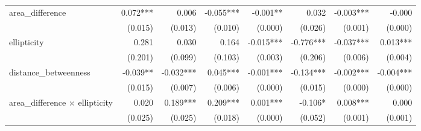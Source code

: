 \begin{tabular}{lrrrrrrr}
area\_difference                           &                     0.072*** &                      0.006 &                    -0.055*** &                         -0.001** &                          0.032 &                                                         -0.003*** &                                              -0.000 \\ 
                                           &                      (0.015) &                    (0.013) &                      (0.010) &                          (0.000) &                        (0.026) &                                                           (0.001) &                                             (0.000) \\ 
ellipticity                                &                        0.281 &                      0.030 &                        0.164 &                        -0.015*** &                      -0.776*** &                                                         -0.037*** &                                            0.013*** \\ 
                                           &                      (0.201) &                    (0.099) &                      (0.103) &                          (0.003) &                        (0.206) &                                                           (0.006) &                                             (0.004) \\ 
distance\_betweenness                      &                     -0.039** &                  -0.032*** &                     0.045*** &                        -0.001*** &                      -0.134*** &                                                         -0.002*** &                                           -0.004*** \\ 
                                           &                      (0.015) &                    (0.007) &                      (0.006) &                          (0.000) &                        (0.015) &                                                           (0.000) &                                             (0.000) \\ 
area\_difference $\times$ ellipticity      &                        0.020 &                   0.189*** &                     0.209*** &                         0.001*** &                        -0.106* &                                                          0.008*** &                                               0.000 \\ 
                                           &                      (0.025) &                    (0.025) &                      (0.018) &                          (0.000) &                        (0.052) &                                                           (0.001) &                                             (0.001) \\ 

\end{tabular}
